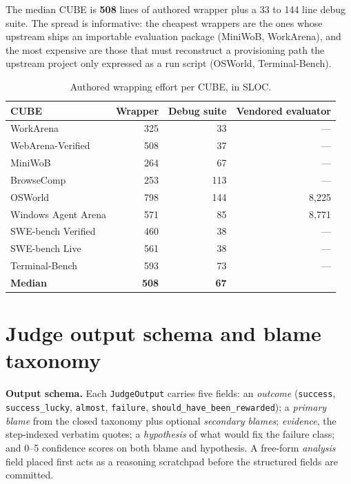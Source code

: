 \documentclass{article}
\newcommand{\mypar}[1]{\par\noindent\textbf{#1}\enspace}
\newcommand{\NA}{\textcolor{gray!60}{---}}   %
\begin{document}
The median CUBE is \textbf{508} lines of authored wrapper plus a 33 to 144 line
debug suite. The spread is informative: the cheapest wrappers are the ones whose
upstream ships an importable evaluation package (MiniWoB, WorkArena), and the
most expensive are those that must reconstruct a provisioning path the upstream
project only expressed as a run script (OSWorld, Terminal-Bench).

\begin{table}[h]
\centering
\caption{Authored wrapping effort per CUBE, in SLOC.}
\label{tab:wrapping-effort}
\footnotesize
\setlength{\tabcolsep}{6pt}
\renewcommand{\arraystretch}{1.05}
\begin{tabular}{lrrr}
\toprule
\textbf{CUBE} & \textbf{Wrapper} & \textbf{Debug suite} & \textbf{Vendored evaluator} \\
\midrule
WorkArena            & 325 &  33 & \NA \\
WebArena-Verified    & 508 &  37 & \NA \\
MiniWoB              & 264 &  67 & \NA \\
BrowseComp           & 253 & 113 & \NA \\
OSWorld              & 798 & 144 & 8{,}225 \\
Windows Agent Arena  & 571 &  85 & 8{,}771 \\
SWE-bench Verified   & 460 &  38 & \NA \\
SWE-bench Live       & 561 &  38 & \NA \\
Terminal-Bench       & 593 &  73 & \NA \\
\midrule
\textbf{Median}      & \textbf{508} & \textbf{67} & \\
\bottomrule
\end{tabular}
\end{table}

\section{Judge output schema and blame taxonomy}
\label{apdx:judge-schema}

\mypar{Output schema.}
Each \texttt{JudgeOutput} carries five fields: an \emph{outcome}
(\texttt{success}, \texttt{success\_lucky}, \texttt{almost},
\texttt{failure}, \texttt{should\_have\_been\_rewarded}); a \emph{primary
blame} from the closed taxonomy plus optional \emph{secondary blames};
\emph{evidence}, the step-indexed verbatim quotes; a \emph{hypothesis} of
what would fix the failure class; and 0--5 confidence scores on both
blame and hypothesis. A free-form \emph{analysis} field placed first acts
as a reasoning scratchpad before the structured fields are committed.
\end{document}
